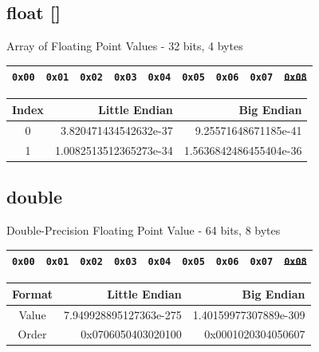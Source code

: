 \documentclass{beamer}
\begin{document}
\subsection{float []}
\begin{frame}{Array of Floating Point Values - 32 bits, 4 bytes}

\begin{table}[]
\begin{tabular}{|l|l|l|l|l|l|l|l|l|}
\hline
 \color{red}\texttt{0x00} & \color{red}\texttt{0x01} & \color{red}\texttt{0x02} & \color{red}\texttt{0x03} & \color{blue}\texttt{0x04} & \color{blue}\texttt{0x05} & \color{blue}\texttt{0x06} & \color{blue}\texttt{0x07} &
 \sout{\texttt{0x08}} \\
\hline 
\end{tabular}
\end{table}

\begin{table}[]
\begin{tabular}{c r r}
Index & Little Endian & Big Endian \\
\hline
0 &  3.820471434542632e-37   & 9.25571648671185e-41 \\
1 & 1.0082513512365273e-34 & 1.5636842486455404e-36
\end{tabular}
\end{table}

\end{frame}

\subsection{double}
\begin{frame}{Double-Precision Floating Point Value - 64 bits, 8 bytes}

\begin{table}[]
\begin{tabular}{|l|l|l|l|l|l|l|l|l|}
\hline
 \color{red}\texttt{0x00} & \color{red}\texttt{0x01} & \color{red}\texttt{0x02} & \color{red}\texttt{0x03} & \color{red}\texttt{0x04} & \color{red}\texttt{0x05} & \color{red}\texttt{0x06} & \color{red}\texttt{0x07} &
 \sout{\texttt{0x08}} \\
\hline 
\end{tabular}
\end{table}

\begin{table}[]
\begin{tabular}{c r r}
Format & Little Endian & Big Endian \\
\hline
Value &  7.949928895127363e-275   & 1.40159977307889e-309 \\
Order & 0x0706050403020100 & 0x0001020304050607
\end{tabular}
\end{table}

\end{frame}
\end{document}
